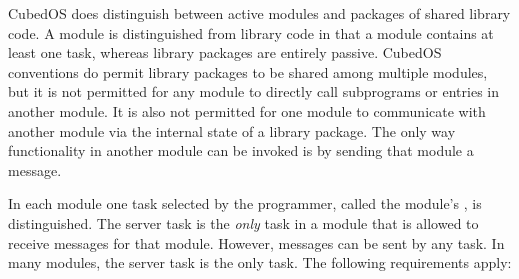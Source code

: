 CubedOS does distinguish between active modules and packages of shared library code. A module is
distinguished from library code in that a module contains at least one task, whereas library
packages are entirely passive. CubedOS conventions do permit library packages to be shared among
multiple modules, but it is not permitted for any module to directly call subprograms or entries
in another module. It is also not permitted for one module to communicate with another module
via the internal state of a library package. 
The only way functionality in another module can be invoked is by sending that module a message.

In each module one task selected by the programmer, called the module's ,
is distinguished. The server task is the \emph{only} task in a module that is allowed to receive
messages for that module. However, messages can be sent by any task. In many modules, the server
task is the only task. The following requirements apply:

